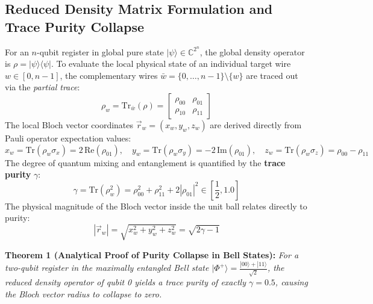 \documentclass[11pt, a4paper]{article}
\begin{document}
\subsection{Reduced Density Matrix Formulation and Trace Purity Collapse}
For an $n$-qubit register in global pure state $|\psi\rangle \in \mathbb{C}^{2^n}$, the global density operator is $\rho = |\psi\rangle\langle\psi|$. To evaluate the local physical state of an individual target wire $w \in [0, n-1]$, the complementary wires $\bar{w} = \{0, \dots, n-1\} \setminus \{w\}$ are traced out via the \textit{partial trace}:
\begin{equation}
\rho_w = \text{Tr}_{\bar{w}}(\rho) = \begin{bmatrix} \rho_{00} & \rho_{01} \\ \rho_{10} & \rho_{11} \end{bmatrix}
\end{equation}
The local Bloch vector coordinates $\vec{r}_w = (x_w, y_w, z_w)$ are derived directly from Pauli operator expectation values:
\begin{equation}
x_w = \text{Tr}(\rho_w \sigma_x) = 2\,\text{Re}(\rho_{01}), \quad y_w = \text{Tr}(\rho_w \sigma_y) = -2\,\text{Im}(\rho_{01}), \quad z_w = \text{Tr}(\rho_w \sigma_z) = \rho_{00} - \rho_{11}
\end{equation}
The degree of quantum mixing and entanglement is quantified by the \textbf{trace purity} $\gamma$:
\begin{equation}
\gamma = \text{Tr}(\rho_w^2) = \rho_{00}^2 + \rho_{11}^2 + 2|\rho_{01}|^2 \in \left[ \frac{1}{2}, 1.0 \right]
\end{equation}
The physical magnitude of the Bloch vector inside the unit ball relates directly to purity:
\begin{equation}
|\vec{r}_w| = \sqrt{x_w^2 + y_w^2 + z_w^2} = \sqrt{2\gamma - 1}
\end{equation}

\noindent\textbf{Theorem 1 (Analytical Proof of Purity Collapse in Bell States):} \textit{For a two-qubit register in the maximally entangled Bell state $|\Phi^+\rangle = \frac{|00\rangle + |11\rangle}{\sqrt{2}}$, the reduced density operator of qubit 0 yields a trace purity of exactly $\gamma = 0.5$, causing the Bloch vector radius to collapse to zero.}
\end{document}
